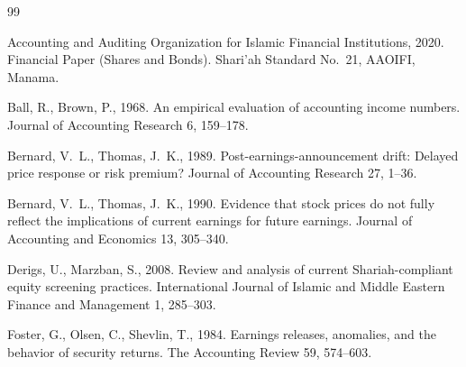 \documentclass[11pt,letterpaper]{article}
\begin{document}

\begin{thebibliography}{99}

Accounting and Auditing Organization for Islamic Financial Institutions, 2020.
\newblock Financial Paper (Shares and Bonds).
\newblock Shari'ah Standard No.~21, AAOIFI, Manama.

Ball, R., Brown, P., 1968.
\newblock An empirical evaluation of accounting income numbers.
\newblock Journal of Accounting Research 6, 159--178.

Bernard, V.~L., Thomas, J.~K., 1989.
\newblock Post-earnings-announcement drift: Delayed price response or risk premium?
\newblock Journal of Accounting Research 27, 1--36.

Bernard, V.~L., Thomas, J.~K., 1990.
\newblock Evidence that stock prices do not fully reflect the implications of current earnings for future earnings.
\newblock Journal of Accounting and Economics 13, 305--340.

Derigs, U., Marzban, S., 2008.
\newblock Review and analysis of current Shariah-compliant equity screening practices.
\newblock International Journal of Islamic and Middle Eastern Finance and Management 1, 285--303.

Foster, G., Olsen, C., Shevlin, T., 1984.
\newblock Earnings releases, anomalies, and the behavior of security returns.
\newblock The Accounting Review 59, 574--603.

\end{thebibliography}
\end{document}
